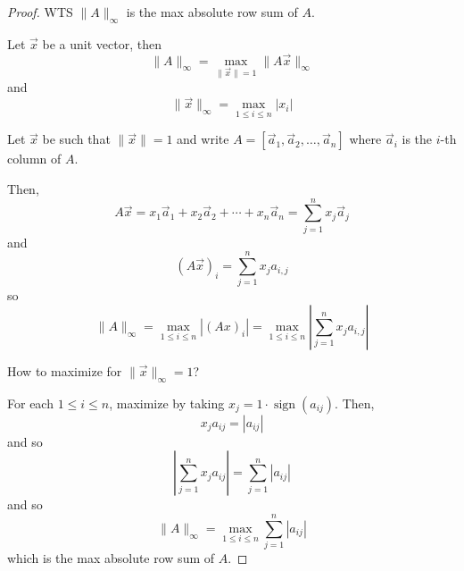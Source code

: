 \begin{proof}
    WTS \( \| A \|_\infty \) is the max absolute row sum of \( A \).

    Let \( \vec{x} \) be a unit vector, then \[
        \| A \|_\infty = \max_{\| \vec{x} \| = 1} \| A \vec{x} \|_\infty
    \] and \[
        \| \vec{x} \|_\infty = \max_{1 \leq i \leq n} | x_i |
    \]

    Let \( \vec{x} \) be such that \( \| \vec{x} \| = 1 \) and write \( A = [ \vec{a}_1, \vec{a}_2, \ldots, \vec{a}_n ] \) where \( \vec{a}_i \) is the \( i \)-th column of \( A \).

    Then, \[
        A \vec{x} = x_1 \vec{a}_1 + x_2 \vec{a}_2 + \cdots + x_n \vec{a}_n = \sum_{j=1}^n x_j \vec{a}_j
    \] and \[
        ( A \vec{x} )_i = \sum_{j=1}^n x_j a_{i, j}
    \] so \[
        \| A \|_\infty = \max_{1 \leq i \leq n} | (Ax)_i | = \max_{1 \leq i \leq n} \left| \sum_{j=1}^n x_j a_{i, j} \right|
    \]

    How to maximize for \( \| \vec{x} \|_\infty = 1 \)?

    For each \( 1 \leq i \leq n \), maximize by taking \( x_j = 1 \cdot \operatorname{sign}(a_{ij}) \). Then, \[
        x_j a_{ij} = | a_{ij} |
    \] and so \[
        \left| \sum_{j=1}^n x_j a_{ij} \right| = \sum_{j=1}^n | a_{ij} |
    \] and so \[
        \| A \|_\infty = \max_{1 \leq i \leq n} \sum_{j=1}^n | a_{ij} |
    \] which is the max absolute row sum of \( A \).
\end{proof}